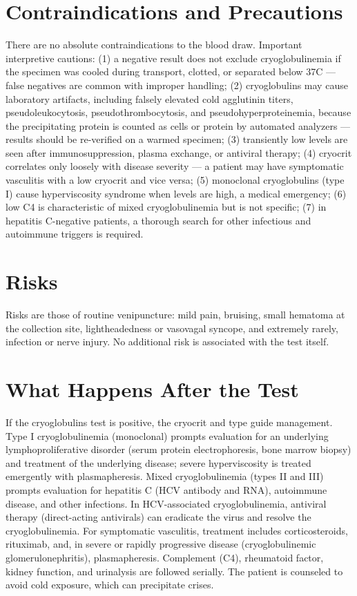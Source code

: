 \section*{Contraindications and Precautions}
There are no absolute contraindications to the blood draw. Important interpretive cautions: (1) a negative result does not exclude cryoglobulinemia if the specimen was cooled during transport, clotted, or separated below 37\textdegree{}C --- false negatives are common with improper handling; (2) cryoglobulins may cause laboratory artifacts, including falsely elevated cold agglutinin titers, pseudoleukocytosis, pseudothrombocytosis, and pseudohyperproteinemia, because the precipitating protein is counted as cells or protein by automated analyzers --- results should be re-verified on a warmed specimen; (3) transiently low levels are seen after immunosuppression, plasma exchange, or antiviral therapy; (4) cryocrit correlates only loosely with disease severity --- a patient may have symptomatic vasculitis with a low cryocrit and vice versa; (5) monoclonal cryoglobulins (type I) cause hyperviscosity syndrome when levels are high, a medical emergency; (6) low C4 is characteristic of mixed cryoglobulinemia but is not specific; (7) in hepatitis C-negative patients, a thorough search for other infectious and autoimmune triggers is required.

\section*{Risks}
Risks are those of routine venipuncture: mild pain, bruising, small hematoma at the collection site, lightheadedness or vasovagal syncope, and extremely rarely, infection or nerve injury. No additional risk is associated with the test itself.

\section*{What Happens After the Test}
If the cryoglobulins test is positive, the cryocrit and type guide management. Type I cryoglobulinemia (monoclonal) prompts evaluation for an underlying lymphoproliferative disorder (serum protein electrophoresis, bone marrow biopsy) and treatment of the underlying disease; severe hyperviscosity is treated emergently with plasmapheresis. Mixed cryoglobulinemia (types II and III) prompts evaluation for hepatitis C (HCV antibody and RNA), autoimmune disease, and other infections. In HCV-associated cryoglobulinemia, antiviral therapy (direct-acting antivirals) can eradicate the virus and resolve the cryoglobulinemia. For symptomatic vasculitis, treatment includes corticosteroids, rituximab, and, in severe or rapidly progressive disease (cryoglobulinemic glomerulonephritis), plasmapheresis. Complement (C4), rheumatoid factor, kidney function, and urinalysis are followed serially. The patient is counseled to avoid cold exposure, which can precipitate crises.

